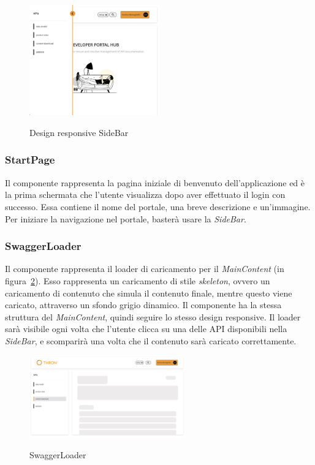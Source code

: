 \begin{figure}[ht]
  \centering
  \includegraphics[width=0.5\textwidth, alt={Design responsive della barra laterale}]{images/frontend/Sidebar.jpg}
  \caption{Design responsive SideBar}\label{fig:side-bar-responsive}
\end{figure}

\subsubsection{StartPage}\label{subsubsec:start-page}
Il componente rappresenta la pagina iniziale di benvenuto dell'applicazione ed è la prima schermata che l'utente visualizza dopo aver effettuato il login con successo.
Essa contiene il nome del portale, una breve descrizione e un'immagine. Per iniziare la navigazione nel portale, basterà usare la \textit{SideBar}.

\subsubsection{SwaggerLoader}\label{subsubsec:swagger-loader}
Il componente rappresenta il loader di caricamento per il \textit{MainContent} (in figura~\ref{fig:swagger-loader}). 
Esso rappresenta un caricamento di stile \textit{skeleton}, ovvero un caricamento di contenuto che simula il contenuto finale, mentre questo viene caricato, attraverso un sfondo grigio dinamico.
Il componente ha la stessa struttura del \textit{MainContent}, quindi seguire lo stesso design responsive.
Il loader sarà visibile ogni volta che l'utente clicca su una delle API disponibili nella \textit{SideBar}, e scomparirà una volta che il contenuto sarà caricato correttamente.

\begin{figure}[ht]
  \centering
  \includegraphics[width=0.6\textwidth, alt={Skeleton loader di caricamento per contenuto principale}]{images/frontend/SwaggerLoader.jpg}
  \caption{SwaggerLoader}\label{fig:swagger-loader}
\end{figure}

